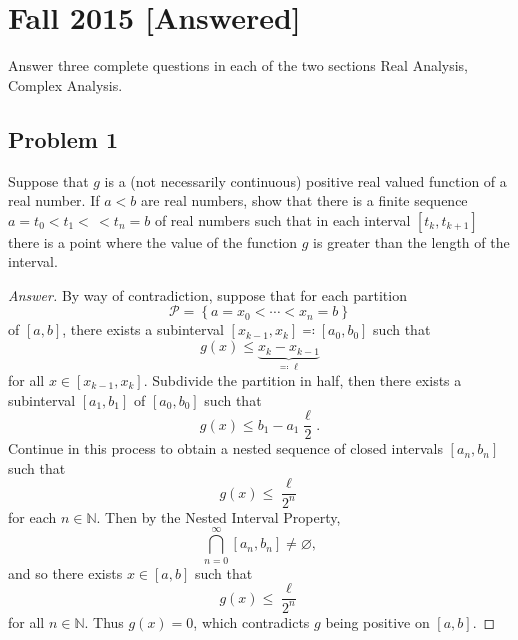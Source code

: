 \documentclass[12pt]{article}
\newcommand{\n}{\mathbb{N}}
\newcommand\setb[1]{\left \{ #1 \right \}}
\newcommand{\sqbrack}[1]{\left [ #1 \right ]}
\theoremstyle{definition}
\begin{document}
\newpage
\section{Fall 2015 [Answered]}
Answer three complete questions in each of the two sections Real Analysis, Complex Analysis. 

\subsection{Problem 1 \texorpdfstring{\cite{Nguyen}}{}}
Suppose that $g$ is a (not necessarily continuous) positive real valued function of a real number. If $a < b$ are real numbers, show that there is a finite sequence $a = t_0 < t_1 < \, < t_n = b$ of real numbers such that in each interval $\sqbrack{ t_k , t_{k+1} }$ there is a point where the value of the function $g$ is greater than the length of the interval. 
\begin{proof}[Answer]
    By way of contradiction, suppose that for each partition 
    \[
        \mathcal{P} = \setb{ a = x_0 < \dotsb < x_n = b }
    \]
    of $[a,b]$, there exists a subinterval $\sqbrack{ x_{k-1} , x_k } \eqqcolon \sqbrack{ a_0 , b_0 }$ such that 
    \[
        g(x) \leq \underbrace{ x_{k} - x_{k-1} }_{ \eqqcolon \ell }
    \]
    for all $x \in \sqbrack{ x_{k-1} , x_k }$. Subdivide the partition in half, then there exists a subinterval $\sqbrack{ a_1 , b_1 }$ of $\sqbrack{ a_0 , b_0 }$ such that 
    \[
        g(x) \leq b_1 - a_1 \frac{\ell}{2} .
    \]
    Continue in this process to obtain a nested sequence of closed intervals $\sqbrack{ a_n , b_n }$ such that 
    \[
        g(x) \leq \frac{\ell}{2^n}
    \]
    for each $n \in \n$. Then by the Nested Interval Property, 
    \[
        \bigcap\limits_{n = 0}^{\infty} \sqbrack{ a_n , b_n } \neq \varnothing , 
    \]
    and so there exists $x \in [a,b]$ such that 
    \[
        g(x) \leq \frac{\ell}{2^n}
    \]
    for all $n \in \n$. Thus $g(x) = 0$, which contradicts $g$ being positive on $[a,b]$. 
\end{proof}
\end{document}
